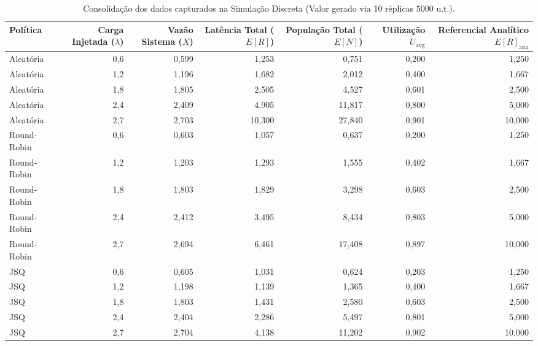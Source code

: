 \documentclass[conference]{IEEEtran}
\begin{document}
\begin{table}[!t]
\centering
\caption{Consolidação dos dados capturados na Simulação Discreta (Valor gerado via 10 réplicas $5000$ u.t.).}
\label{tab:simulacao}
\small
\setlength{\tabcolsep}{1pt}
\begin{tabular}{@{}lrrrrrr@{}}
\toprule
Política & Carga Injetada ($\lambda$) & Vazão Sistema ($X$) & Latência Total ($E[R]$) & População Total ($E[N]$) & Utilização $U_{\text{avg}}$ & Referencial Analítico $E[R]_{\text{ana}}$ \\
\midrule
Aleatória      & 0,6 & 0,599 & 1,253 & 0,751 & 0,200 & 1,250 \\
Aleatória      & 1,2 & 1,196 & 1,682 & 2,012 & 0,400 & 1,667 \\
Aleatória      & 1,8 & 1,805 & 2,505 & 4,527 & 0,601 & 2,500 \\
Aleatória      & 2,4 & 2,409 & 4,905 & 11,817 & 0,800 & 5,000 \\
Aleatória      & 2,7 & 2,703 & 10,300 & 27,840 & 0,901 & 10,000 \\
Round-Robin    & 0,6 & 0,603 & 1,057 & 0,637 & 0,200 & 1,250 \\
Round-Robin    & 1,2 & 1,203 & 1,293 & 1,555 & 0,402 & 1,667 \\
Round-Robin    & 1,8 & 1,803 & 1,829 & 3,298 & 0,603 & 2,500 \\
Round-Robin    & 2,4 & 2,412 & 3,495 & 8,434 & 0,803 & 5,000 \\
Round-Robin    & 2,7 & 2,694 & 6,461 & 17,408 & 0,897 & 10,000 \\
JSQ            & 0,6 & 0,605 & 1,031 & 0,624 & 0,203 & 1,250 \\
JSQ            & 1,2 & 1,198 & 1,139 & 1,365 & 0,400 & 1,667 \\
JSQ            & 1,8 & 1,803 & 1,431 & 2,580 & 0,603 & 2,500 \\
JSQ            & 2,4 & 2,404 & 2,286 & 5,497 & 0,801 & 5,000 \\
JSQ            & 2,7 & 2,704 & 4,138 & 11,202 & 0,902 & 10,000 \\
\bottomrule
\end{tabular}
\end{table}
\end{document}
